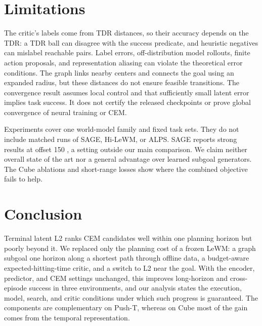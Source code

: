 \documentclass{article} %
\theoremstyle{definition}
\theoremstyle{remark}
\begin{document}
\section{Limitations}
\label{sec:limitations}
The critic's labels come from TDR distances, so their accuracy depends on the TDR:
a TDR ball can disagree with the success predicate, and heuristic negatives can mislabel reachable pairs.
Label errors, off-distribution model rollouts, finite action proposals, and
representation aliasing can violate the theoretical error conditions.
The graph links nearby centers and connects the goal using an expanded radius, but these
distances do not ensure feasible transitions. The convergence result assumes local control
and that sufficiently small latent error implies task success. It does not certify the released
checkpoints or prove global convergence of neural training or CEM.

Experiments cover one world-model family and fixed task sets. They do not include matched
runs of SAGE, Hi-LeWM, or ALPS. SAGE reports strong results at offset 150
\citep{sage}, a setting outside our main comparison. We claim neither overall state of the art
nor a general advantage over learned subgoal generators.
The Cube ablations and short-range losses show where the combined objective fails to help.

\section{Conclusion}
Terminal latent L2 ranks CEM candidates well within one planning horizon but poorly beyond it.
We replaced only the planning cost of a frozen LeWM: a graph subgoal one horizon along a shortest
path through offline data, a budget-aware expected-hitting-time critic, and a switch to L2 near
the goal. With the encoder, predictor, and CEM settings unchanged, this improves long-horizon and
cross-episode success in three environments, and our analysis states the execution, model,
search, and critic conditions under which such progress is guaranteed. The components are
complementary on Push-T, whereas on Cube most of the gain comes from the temporal representation.

\end{document}
